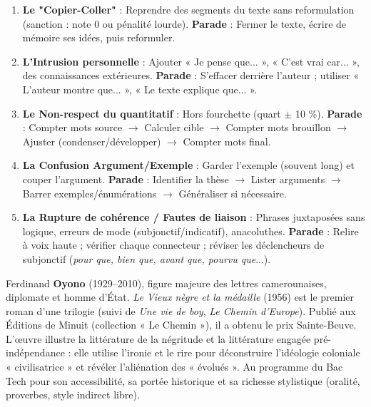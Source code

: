 \documentclass[11pt]{article}
\newcommand{\cle}[1]{{\popxbold\color{popdark}#1}}
\begin{document}
\begin{attention}
\begin{enumerate}
\item \textbf{Le "Copier-Coller"} : Reprendre des segments du texte sans reformulation (sanction : note 0 ou pénalité lourde). \textbf{Parade} : Fermer le texte, écrire de mémoire ses idées, puis reformuler.
\item \textbf{L'Intrusion personnelle} : Ajouter « Je pense que... », « C'est vrai car... », des connaissances extérieures. \textbf{Parade} : S'effacer derrière l'auteur ; utiliser « L'auteur montre que... », « Le texte explique que... ».
\item \textbf{Le Non-respect du quantitatif} : Hors fourchette (quart $\pm$ 10 \%). \textbf{Parade} : Compter mots source $\rightarrow$ Calculer cible $\rightarrow$ Compter mots brouillon $\rightarrow$ Ajuster (condenser/développer) $\rightarrow$ Compter mots final.
\item \textbf{La Confusion Argument/Exemple} : Garder l'exemple (souvent long) et couper l'argument. \textbf{Parade} : Identifier la thèse $\rightarrow$ Lister arguments $\rightarrow$ Barrer exemples/énumérations $\rightarrow$ Généraliser si nécessaire.
\item \textbf{La Rupture de cohérence / Fautes de liaison} : Phrases juxtaposées sans logique, erreurs de mode (subjonctif/indicatif), anacoluthes. \textbf{Parade} : Relire à voix haute ; vérifier chaque connecteur ; réviser les déclencheurs de subjonctif (\emph{pour que, bien que, avant que, pourvu que}...).
\end{enumerate}
\end{attention}

\begin{savaistu}
Ferdinand \textbf{Oyono} (1929--2010), figure majeure des lettres camerounaises, diplomate et homme d'État. \emph{Le Vieux nègre et la médaille} (1956) est le premier roman d'une trilogie (suivi de \emph{Une vie de boy}, \emph{Le Chemin d'Europe}). Publié aux Éditions de Minuit (collection « Le Chemin »), il a obtenu le prix Sainte-Beuve. L'œuvre illustre la \cle{littérature de la négritude} et la \cle{littérature engagée} pré-indépendance : elle utilise l'ironie et le rire pour déconstruire l'idéologie coloniale « civilisatrice » et révéler l'aliénation des « évolués ». Au programme du Bac Tech pour son accessibilité, sa portée historique et sa richesse stylistique (oralité, proverbes, style indirect libre).
\end{savaistu}
\end{document}
